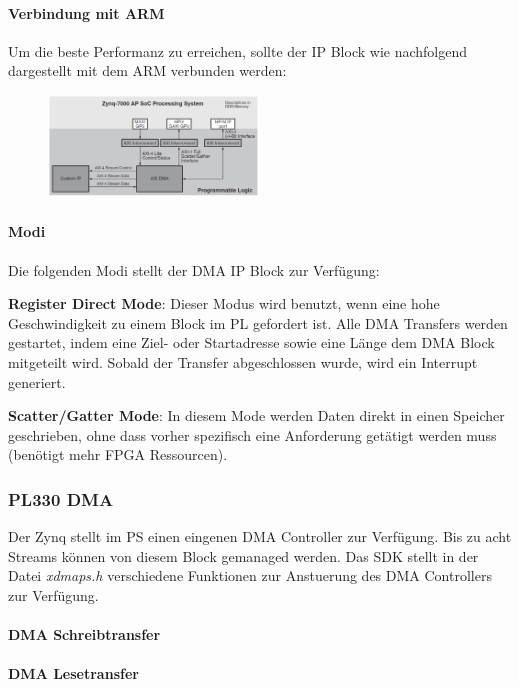 \begin{multicols}{2}
\paragraph{Verbindung mit ARM}
Um die beste  Performanz zu erreichen, sollte der IP Block wie nachfolgend dargestellt mit dem ARM verbunden werden:
\begin{figure}[H]
    \includegraphics[width=0.5\textwidth]{images/sdk_dmaip.png}
\end{figure}

\paragraph{Modi}
Die folgenden Modi stellt der DMA IP Block zur Verfügung:
\begin{compactitem}
    \item \textbf{Register Direct Mode}: Dieser Modus wird benutzt, wenn eine hohe Geschwindigkeit zu einem Block im PL gefordert ist. Alle DMA Transfers werden gestartet, indem eine Ziel- oder Startadresse sowie eine Länge dem DMA Block mitgeteilt wird. Sobald der Transfer abgeschlossen wurde, wird ein Interrupt generiert.
    \item \textbf{Scatter/Gatter Mode}: In diesem Mode werden Daten direkt in einen Speicher geschrieben, ohne dass vorher spezifisch eine Anforderung getätigt werden muss (benötigt mehr FPGA Ressourcen).
\end{compactitem}
\end{multicols}
\subsubsection{PL330 DMA}
Der Zynq stellt im PS einen eingenen DMA Controller zur Verfügung. Bis zu acht Streams können von diesem Block gemanaged werden. Das SDK stellt in der Datei \textit{xdmaps.h} verschiedene Funktionen zur Anstuerung des DMA Controllers zur Verfügung.

\paragraph{DMA Schreibtransfer}


\paragraph{DMA Lesetransfer}
